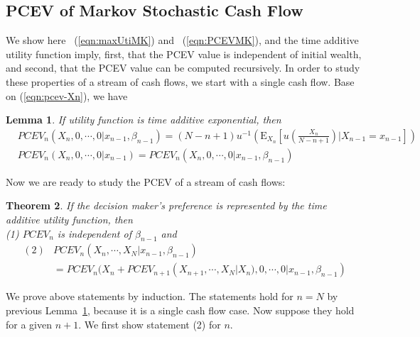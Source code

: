 \documentclass{article}[12pt letter]
\newtheorem{theorem}{Theorem}
\newtheorem{lemma}[theorem]{Lemma}
\newcommand{\E}{\mathrm{E}}
\begin{document}
\subsection{PCEV of Markov Stochastic Cash Flow}
We show here ~(\ref{eqn:maxUtiMK}) and ~(\ref{eqn:PCEVMK}), and the time additive utility function imply,  first, that the PCEV value is independent of initial wealth, and second, that the PCEV value can be computed recursively. In order to study these properties of a stream of cash flows, we start with a single cash flow. Base on (\ref{eqn:pcev-Xn}), we have
\begin{lemma}\label{lem:oneCF-PCEV}
If utility function is time additive exponential, then
\begin{align}
&PCEV_n(X_n, 0,\cdots,0|x_{n-1},\beta_{n-1}) = (N-n+1)u^{-1}(\E_{X_n}[u(\frac{X_n}{N-n+1})|X_{n-1}=x_{n-1}]) \\
&PCEV_n(X_n,0,\cdots,0|x_{n-1}) = PCEV_n(X_n,0,\cdots,0|x_{n-1},\beta_{n-1})
\end{align}
\end{lemma}


Now we are ready to study the PCEV of a stream of cash flows:

\begin{theorem}\label{theo:PCEVMK}
If the decision maker's preference is represented by the time additive utility function, then\\
(1) $PCEV_n$ is independent of $\beta_{n-1}$ and
\begin{align}
(2) &PCEV_n(X_n,\cdots,X_N|x_{n-1}, \beta_{n-1}) \nonumber \\&= PCEV_n(X_n + PCEV_{n+1}(X_{n+1},\cdots,X_N|X_n), 0,\cdots,0|x_{n-1},\beta_{n-1})
\end{align}
\end{theorem}
\proof
We prove above statements by induction. The statements hold for $n=N$ by previous Lemma~\ref{lem:oneCF-PCEV},  because it is a single cash flow case. Now suppose they hold for a given $n+1$. We first show statement (2) for $n$.
\end{document}
